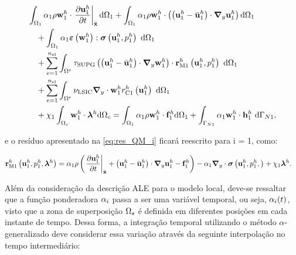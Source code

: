 \begin{align}
	\begin{split}
		&\int_{\localModel} \arlequinWFLocal \density \wlocalh \cdot \left. \frac{\partial\ulocalh}{\partial t} \right|_{\posALE} \deriv \localModel +
		\int_{\localModel} \arlequinWFLocal \density \wlocalh \cdot  \left(\left(\ulocalh - \velocityALEh_{1}\right) \cdot \gradient \ulocalh\right) \deriv \localModel  \\ 
		&\quad+	
		\int_{\localModel} \arlequinWFLocal \straintensor \left(\wlocalh\right) : \stressTensor \left(\ulocalh,\plocalh\right)\ \deriv \localModel 
		\\ 
		&\quad+ \sum_{e=1}^{\nel} \int_{\domainE} \SUPG  \left( \left(\ulocalh - \velocityALEh_{1}\right) \cdot \gradient \wlocalh\right) \cdot \resMomLocal\left(\ulocalh,\plocalh \right)\  \deriv \localModel \\ 
		&\quad+\sum_{e=1}^{\nel} \int_{\domainE} \LSIC \divergence \cdot \wlocalh \resPreLocal
		\left(\ulocalh\right)\  \deriv \localModel \\
		&\quad+  \chi_{1} \int_{\gluingZone} \wlocalh \cdot \lagrangeMultiplierh \deriv \gluingZone  = \int_{\localModel} \arlequinWFLocal \density \wlocalh \cdot  \localsbodyforceh \deriv \localModel + \int_{\localBoundaryN} \arlequinWFLocal \wlocalh \cdot \localSurfaceLoadh\ \deriv \localBoundaryN,
		\label{eq:eq:QM_forma_fraca_1_ALE}
	\end{split}
\end{align}

\noindent e o resíduo apresentado na \autoref{eq:res_QM_i} ficará reescrito para i = 1, como:

\begin{align}
	\mathbf{r}_{\mathrm{M1}}^{h} \left(\mathbf{u}_1^h,p_1^h,\boldsymbol{\lambda}^h \right)&=\alpha_1 \rho\left(\left. \frac{\partial\mathbf{u}_1^h}{\partial t} \right|_{\bar{\mathbf{x}}}+ \left(\mathbf{u}_1^h - \bar{\mathbf{u}}^h_{1}\right) \cdot \boldsymbol{\nabla}_y \mathbf{u}_1^h  - \mathbf{f}_1^h\right) - \alpha_1 \boldsymbol{\nabla}_y \cdot \boldsymbol{\sigma}\left(\mathbf{u}_1^h,p_1^h,\right)+ \chi_{1} \boldsymbol{\lambda}^h \label{eq:res_QM_ALE}.
\end{align}

Além da consideração da descrição ALE para o modelo local, deve-se ressaltar que a função ponderadora $\alpha_i$ passa a ser uma variável temporal, ou seja, $\alpha_i(t)$, visto que a zona de superposição $\Omega_s$ é definida em diferentes posições em cada instante de tempo. Dessa forma, a integração temporal utilizando o método $\alpha$-generalizado deve considerar essa variação através da seguinte interpolação no tempo intermediário:

